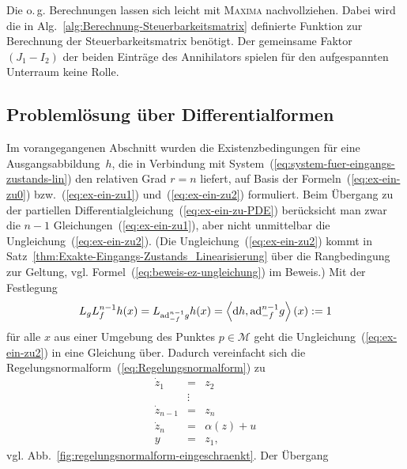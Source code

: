 Die o.\,g. Berechnungen lassen sich leicht mit \textsc{Maxima} nachvollziehen.
Dabei wird die in Alg.~\ref{alg:Berechnung-Steuerbarkeitsmatrix}
definierte Funktion zur Berechnung der Steuerbarkeitsmatrix benötigt.
Der gemeinsame Faktor $(J_{1}-I_{2})$ der beiden Einträge des Annihilators
spielen für den aufgespannten Unterraum keine Rolle.

\begin{maxima}\end{maxima}

\subsection{Problemlösung über Differentialformen\label{subsec:EZ-Linearisierung-Formen}}

Im vorangegangenen Abschnitt wurden die Existenzbedingungen für eine
Ausgangsabbildung~$h$, die in Verbindung mit System~(\ref{eq:system-fuer-eingangs-zustands-lin})
den relativen Grad $r=n$ liefert, auf Basis der Formeln~(\ref{eq:ex-ein-zu0})
bzw.~(\ref{eq:ex-ein-zu1}) und~(\ref{eq:ex-ein-zu2}) formuliert.
Beim Übergang zu der partiellen Differentialgleichung~(\ref{eq:ex-ein-zu-PDE})
berücksicht man zwar die $n-1$ Gleichungen~(\ref{eq:ex-ein-zu1}),
aber nicht unmittelbar die Ungleichung~(\ref{eq:ex-ein-zu2}). (Die
Ungleichung~(\ref{eq:ex-ein-zu2}) kommt in Satz~\ref{thm:Exakte-Eingangs-Zustands_Linearisierung}
über die Rangbedingung zur Geltung, vgl. Formel~(\ref{eq:beweis-ez-ungleichung})
im Beweis.) Mit der Festlegung 
\begin{equation}
L_{g}L_{f}^{n-1}h(x)=L_{{\operatorname{ad}}_{-f}^{n-1}g}h(x)=\left\langle {\mathrm{d}} h,{\operatorname{ad}}_{-f}^{n-1}g\right\rangle (x):=1\label{eq:ex-ez-eing1}
\end{equation}
für alle $x$ aus einer Umgebung des Punktes $p\in\mathcal{M}$ geht
die Ungleichung~(\ref{eq:ex-ein-zu2}) in eine Gleichung über. Dadurch
vereinfacht sich die Regelungsnormalform~(\ref{eq:Regelungsnormalform})
zu
\begin{equation}
\begin{array}{lcl}
\dot{z}_{1} & = & z_{2}\\
 & \vdots\\
\dot{z}_{n-1} & = & z_{n}\\
\dot{z}_{n} & = & \alpha(z)+u\\
y & = & z_{1},
\end{array}\label{eq:regelungsnormalform-eingeschraenkt}
\end{equation}
vgl. Abb.~\ref{fig:regelungsnormalform-eingeschraenkt}. Der Übergang
